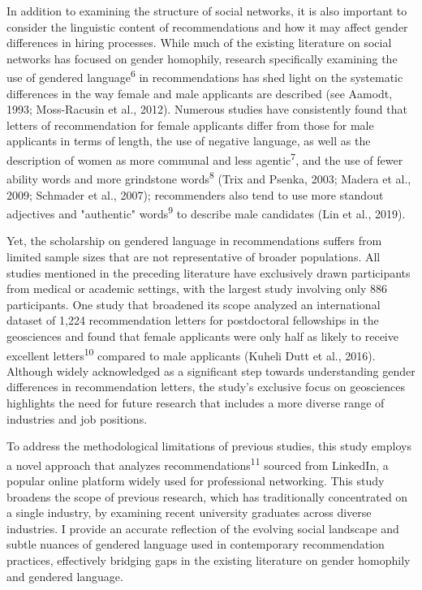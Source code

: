 \documentclass[12pt]{caltech_thesis}
\begin{document}
In addition to examining the structure of social networks, it is also important to consider the linguistic content of recommendations and how it may affect gender differences in hiring processes. While much of the existing literature on social networks has focused on gender homophily, research specifically examining the use of gendered language\textsuperscript{6} in recommendations has shed light on the systematic differences in the way female and male applicants are described (see Aamodt, 1993; Moss-Racusin et al., 2012). Numerous studies have consistently found that letters of recommendation for female applicants differ from those for male applicants in terms of length, the use of negative language, as well as the description of women as more communal and less agentic\textsuperscript{7}, and the use of fewer ability words and more grindstone words\textsuperscript{8} (Trix and Psenka, 2003; Madera et al., 2009; Schmader et al., 2007); recommenders also tend to use more standout adjectives and "authentic" words\textsuperscript{9} to describe male candidates (Lin et al., 2019). 

Yet, the scholarship on gendered language in recommendations suffers from limited sample sizes that are not representative of broader populations. All studies mentioned in the preceding literature have exclusively drawn participants from medical or academic settings, with the largest study involving only 886 participants. One study that broadened its scope analyzed an international dataset of 1,224 recommendation letters for postdoctoral fellowships in the geosciences and found that female applicants were only half as likely to receive excellent letters\textsuperscript{10} compared to male applicants (Kuheli Dutt et al., 2016). Although widely acknowledged as a significant step towards understanding gender differences in recommendation letters, the study's exclusive focus on geosciences highlights the need for future research that includes a more diverse range of industries and job positions.

To address the methodological limitations of previous studies, this study employs a novel approach that analyzes recommendations\textsuperscript{11} sourced from LinkedIn, a popular online platform widely used for professional networking. This study broadens the scope of previous research, which has traditionally concentrated on a single industry, by examining recent university graduates across diverse industries. I provide an accurate reflection of the evolving social landscape and subtle nuances of gendered language used in contemporary recommendation practices, effectively bridging gaps in the existing literature on gender homophily and gendered language.
\end{document}
